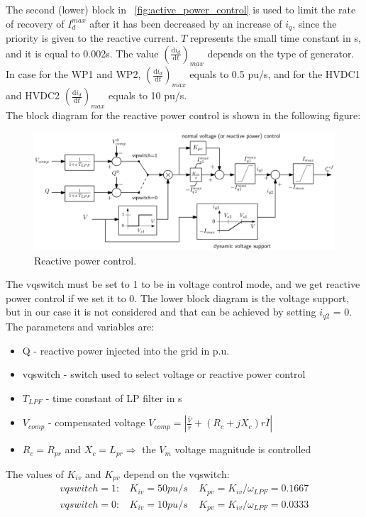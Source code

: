 \documentclass{report}
\begin{document}
The second (lower) block in \figurename~\ref{fig:active_power_control} is used to limit the rate of recovery of $I_d^{max}$ after it has been decreased by an increase of $i_q$, since the priority is given to the reactive current. $T$ represents the small time constant in s, and it is equal to 0.002s. The value $(\frac{\text{d}i_d}{\text{d}t})_{max}$ depends on the type of generator. In case for the WP1 and WP2, $(\frac{\text{d}i_d}{\text{d}t})_{max}$ equals to 0.5 pu/s, and for the HVDC1 and HVDC2 $(\frac{\text{d}i_d}{\text{d}t})_{max}$ equals to 10 pu/s.
\\
The block diagram for the reactive power control is shown in the following figure:
\begin{figure}[H]
    \centering
    \includegraphics[scale = 0.3]{Figure_converter/reactive_power_control.png}
    \caption{Reactive power control.}
    \label{fig:reactive_power_control}
\end{figure}
The vqswitch must be set to 1 to be in voltage control mode, and we get reactive power control if we set it to 0. The lower block diagram is the voltage support, but in our case it is not considered and that can be achieved by setting $i_{q2}$ = 0.
The parameters and variables are:
\begin{itemize}
    \item Q - reactive power injected into the grid in p.u.
    \item vqswitch - switch used to select voltage or reactive power control
    \item $T_{LPF}$ - time constant of LP filter in s
    \item $V_{comp}$ - compensated voltage $V_{comp} = |\frac{\bar{V}}{r} + (R_c + jX_c)r\bar{I}|$
    \item $R_c = R_{pr}$ and $X_c = L_{pr} \Rightarrow$ the $V_m$ voltage magnitude is controlled
\end{itemize}
The values of $K_{iv}$ and $K_{pv}$ depend on the vqswitch:
\begin{gather*}
    vqswitch = 1:~~~~K_{iv} = 50 pu/s~~~~~K_{pv} = K_{iv}/\omega_{LPF} = 0.1667\\
    vqswitch = 0:~~~~K_{iv} = 10 pu/s~~~~~K_{pv} = K_{iv}/\omega_{LPF} = 0.0333
\end{gather*}
\end{document}
